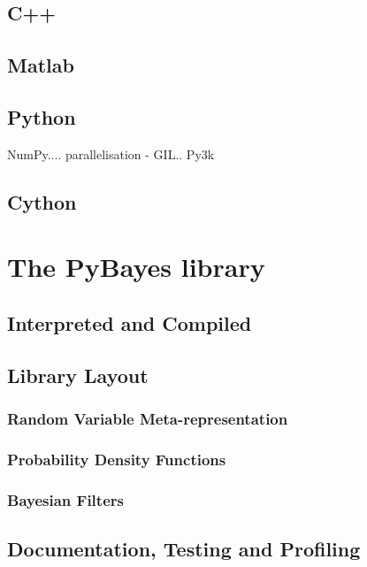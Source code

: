 \documentclass[a4paper,12pt,oneside]{report}
\begin{document}
\section{C++}

\section{Matlab}

\section{Python}

NumPy.... parallelisation - GIL.. Py3k

\section{Cython}


\chapter{The PyBayes library}

\section{Interpreted and Compiled}

\section{Library Layout}

\subsection{Random Variable Meta-representation}

\subsection{Probability Density Functions}

\subsection{Bayesian Filters}

\section{Documentation, Testing and Profiling}
\end{document}
